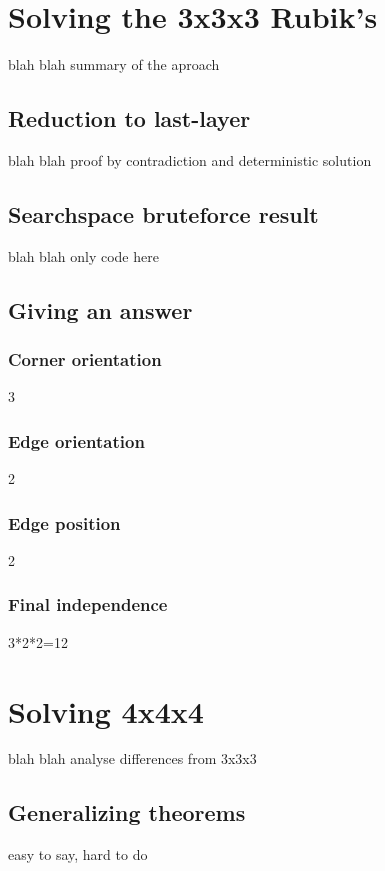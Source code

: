 \documentclass{article}
\begin{document}
    \section{Solving the 3x3x3 Rubik's}
        blah blah summary of the aproach
    
        \subsection{Reduction to last-layer}
            blah blah proof by contradiction and deterministic solution
        
        \subsection{Searchspace bruteforce result}
            blah blah only code here
        
        \subsection{Giving an answer}
            \subsubsection{Corner orientation}
                3

            \subsubsection{Edge orientation}
                2

            \subsubsection{Edge position}
                2

            \subsubsection{Final independence}
                3*2*2=12
    
    \section{Solving 4x4x4}
        blah blah analyse differences from 3x3x3

        \subsection{Generalizing theorems}
            easy to say, hard to do
\end{document}
